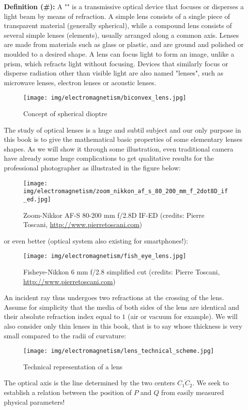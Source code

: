 	\textbf{Definition (\#\mydef):} A "" is a transmissive optical device that focuses or disperses a light beam by means of refraction. A simple lens consists of a single piece of transparent material (generally spherical), while a compound lens consists of several simple lenses (elements), usually arranged along a common axis. Lenses are made from materials such as glass or plastic, and are ground and polished or moulded to a desired shape. A lens can focus light to form an image, unlike a prism, which refracts light without focusing. Devices that similarly focus or disperse radiation other than visible light are also named "lenses", such as microwave lenses, electron lenses or acoustic lenses.
	\begin{figure}[H]
		\centering
		\texttt{[image: img/electromagnetism/biconvex\_lens.jpg]}
		\caption{Concept of spherical dioptre}
	\end{figure}
	The study of optical lenses is a huge and subtil subject and our only purpose in this book is to give the mathematical basic properties of some elementary lenses shapes. As we will show it through some illustration, even traditional camera have already some huge complications to get qualitative results for the professional photographer as illustrated in the figure below:
	\begin{figure}[H]
		\centering
		\texttt{[image: img/electromagnetism/zoom\_nikkon\_af\_s\_80\_200\_mm\_f\_2dot8D\_if\_ed.jpg]}
		\caption{Zoom-Nikkor AF-S 80-200 mm f/2.8D IF-ED (credits: Pierre Toscani, \url{http://www.pierretoscani.com})}
	\end{figure}
	or even better (optical system also existing for smartphones!):
	\begin{figure}[H]
		\centering
		\texttt{[image: img/electromagnetism/fish\_eye\_lens.jpg]}
		\caption{Fisheye-Nikkon 6 mm f/2.8 simplified cut (credits: Pierre Toscani, \url{http://www.pierretoscani.com})}
	\end{figure}
	An incident ray thus undergoes two refractions at the crossing of the lens. Assume for simplicity that the media of both sides of the lens are identical and their absolute refraction index equal to $1$ (air or vacuum for example). We will also consider only thin lenses in this book, that is to say whose thickness is very small compared to the radii of curvature:
	\begin{figure}[H]
		\centering
		\texttt{[image: img/electromagnetism/lens\_technical\_scheme.jpg]}
		\caption{Technical representation of a lens}
	\end{figure}
	The optical axis is the line determined by the two centers $\overline{C_1C_2}$. We seek to establish a relation between the position of $P$ and $Q$ from easily measured physical parameters!

